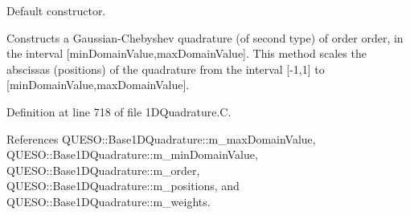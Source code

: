 Default constructor. 

Constructs a Gaussian-\/\-Chebyshev quadrature (of second type) of order {\ttfamily order}, in the interval {\ttfamily \mbox{[}min\-Domain\-Value,max\-Domain\-Value\mbox{]}}. This method scales the abscissas (positions) of the quadrature from the interval \mbox{[}-\/1,1\mbox{]} to {\ttfamily \mbox{[}min\-Domain\-Value,max\-Domain\-Value\mbox{]}}. 

Definition at line 718 of file 1\-D\-Quadrature.\-C.



References Q\-U\-E\-S\-O\-::\-Base1\-D\-Quadrature\-::m\-\_\-max\-Domain\-Value, Q\-U\-E\-S\-O\-::\-Base1\-D\-Quadrature\-::m\-\_\-min\-Domain\-Value, Q\-U\-E\-S\-O\-::\-Base1\-D\-Quadrature\-::m\-\_\-order, Q\-U\-E\-S\-O\-::\-Base1\-D\-Quadrature\-::m\-\_\-positions, and Q\-U\-E\-S\-O\-::\-Base1\-D\-Quadrature\-::m\-\_\-weights.


